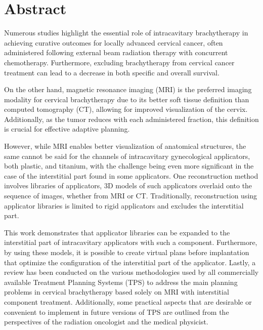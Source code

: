 \documentclass[
  a4paper,
]{scrreprt}
\begin{document}
\newpage{}


\hypertarget{abstract}{%
\chapter*{Abstract}\label{abstract}}


Numerous studies highlight the essential role of intracavitary
brachytherapy in achieving curative outcomes for locally advanced
cervical cancer, often administered following external beam radiation
therapy with concurrent chemotherapy. Furthermore, excluding
brachytherapy from cervical cancer treatment can lead to a decrease in
both specific and overall survival.

On the other hand, magnetic resonance imaging (MRI) is the preferred
imaging modality for cervical brachytherapy due to its better soft
tissue definition than computed tomography (CT), allowing for improved
visualization of the cervix. Additionally, as the tumor reduces with
each administered fraction, this definition is crucial for effective
adaptive planning.

However, while MRI enables better visualization of anatomical
structures, the same cannot be said for the channels of intracavitary
gynecological applicators, both plastic, and titanium, with the
challenge being even more significant in the case of the interstitial
part found in some applicators. One reconstruction method involves
libraries of applicators, 3D models of such applicators overlaid onto
the sequence of images, whether from MRI or CT. Traditionally,
reconstruction using applicator libraries is limited to rigid
applicators and excludes the interstitial part.

This work demonstrates that applicator libraries can be expanded to the
interstitial part of intracavitary applicators with such a component.
Furthermore, by using these models, it is possible to create virtual
plans before implantation that optimize the configuration of the
interstitial part of the applicator. Lastly, a review has been conducted
on the various methodologies used by all commercially available
Treatment Planning Systems (TPS) to address the main planning problems
in cervical brachytherapy based solely on MRI with interstitial
component treatment. Additionally, some practical aspects that are
desirable or convenient to implement in future versions of TPS are
outlined from the perspectives of the radiation oncologist and the
medical physicist.
\end{document}
